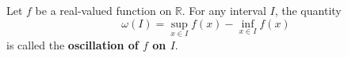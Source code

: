 Let $f$ be a real-valued function on $\mathbb{R}$. For any interval $I$, the quantity
$$\omega(I) = \sup_{x \in I} f(x) - \inf_{x \in I} f(x)$$
is called the \textbf{oscillation of $f$ on $I$}.
